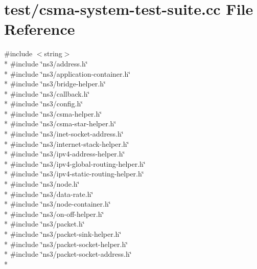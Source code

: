 \hypertarget{csma-system-test-suite_8cc}{}\section{test/csma-\/system-\/test-\/suite.cc File Reference}
\label{csma-system-test-suite_8cc}
{\ttfamily \#include $<$string$>$}\\*
{\ttfamily \#include \char`\"{}ns3/address.\+h\char`\"{}}\\*
{\ttfamily \#include \char`\"{}ns3/application-\/container.\+h\char`\"{}}\\*
{\ttfamily \#include \char`\"{}ns3/bridge-\/helper.\+h\char`\"{}}\\*
{\ttfamily \#include \char`\"{}ns3/callback.\+h\char`\"{}}\\*
{\ttfamily \#include \char`\"{}ns3/config.\+h\char`\"{}}\\*
{\ttfamily \#include \char`\"{}ns3/csma-\/helper.\+h\char`\"{}}\\*
{\ttfamily \#include \char`\"{}ns3/csma-\/star-\/helper.\+h\char`\"{}}\\*
{\ttfamily \#include \char`\"{}ns3/inet-\/socket-\/address.\+h\char`\"{}}\\*
{\ttfamily \#include \char`\"{}ns3/internet-\/stack-\/helper.\+h\char`\"{}}\\*
{\ttfamily \#include \char`\"{}ns3/ipv4-\/address-\/helper.\+h\char`\"{}}\\*
{\ttfamily \#include \char`\"{}ns3/ipv4-\/global-\/routing-\/helper.\+h\char`\"{}}\\*
{\ttfamily \#include \char`\"{}ns3/ipv4-\/static-\/routing-\/helper.\+h\char`\"{}}\\*
{\ttfamily \#include \char`\"{}ns3/node.\+h\char`\"{}}\\*
{\ttfamily \#include \char`\"{}ns3/data-\/rate.\+h\char`\"{}}\\*
{\ttfamily \#include \char`\"{}ns3/node-\/container.\+h\char`\"{}}\\*
{\ttfamily \#include \char`\"{}ns3/on-\/off-\/helper.\+h\char`\"{}}\\*
{\ttfamily \#include \char`\"{}ns3/packet.\+h\char`\"{}}\\*
{\ttfamily \#include \char`\"{}ns3/packet-\/sink-\/helper.\+h\char`\"{}}\\*
{\ttfamily \#include \char`\"{}ns3/packet-\/socket-\/helper.\+h\char`\"{}}\\*
{\ttfamily \#include \char`\"{}ns3/packet-\/socket-\/address.\+h\char`\"{}}\\*
